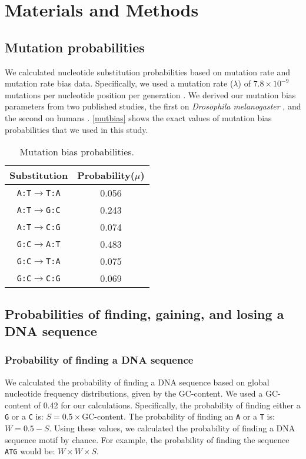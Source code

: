 \documentclass[12pt,a4paper]{article}
\begin{document}
\section{Materials and Methods}

\subsection{Mutation probabilities}

We calculated nucleotide substitution probabilities based on mutation rate and mutation rate bias data. Specifically, we  used a mutation rate ($\lambda$) of $7.8\times10^{-9}$ mutations per nucleotide position per generation \citep{drosophilamutrate}. We derived our mutation bias parameters from two published studies, the first on \textit{Drosophila melanogaster} \citep{drosophilamutrate}, and the second on humans \citep{humanmutrate}. \autoref{mutbias} shows the exact values of mutation bias probabilities that we used in this study.

\begin{table}[H]
\centering
\begin{tabular}{c c}
\toprule
\textbf{Substitution} & Probability($\mu$) \\\midrule
\texttt{A:T}$\to$\texttt{T:A} & 0.056 \\\midrule
\texttt{A:T}$\to$\texttt{G:C} & 0.243 \\\midrule
\texttt{A:T}$\to$\texttt{C:G} & 0.074 \\\midrule
\texttt{G:C}$\to$\texttt{A:T} & 0.483 \\\midrule
\texttt{G:C}$\to$\texttt{T:A} & 0.075 \\\midrule
\texttt{G:C}$\to$\texttt{C:G} & 0.069 \\\bottomrule
\end{tabular}
\caption{Mutation bias probabilities.}
\label{mutbias}
\end{table}

\subsection{Probabilities of finding, gaining, and losing a DNA sequence}
\label{methbasic}

\subsubsection{Probability of finding a DNA sequence}
\label{methprob}

We calculated the probability of finding a DNA sequence based on global nucleotide frequency distributions, given by the GC-content. We used a GC-content of 0.42 for our calculations. Specifically, the probability of finding either a \texttt{G} or a \texttt{C} is: $S = 0.5\times$GC-content. The probability of finding an \texttt{A} or a \texttt{T} is: $W = 0.5 - S$. Using these values, we calculated the probability of finding a DNA sequence motif by chance. For example, the probability of finding the sequence \texttt{ATG} would be: $W\times W \times S$.
\end{document}
